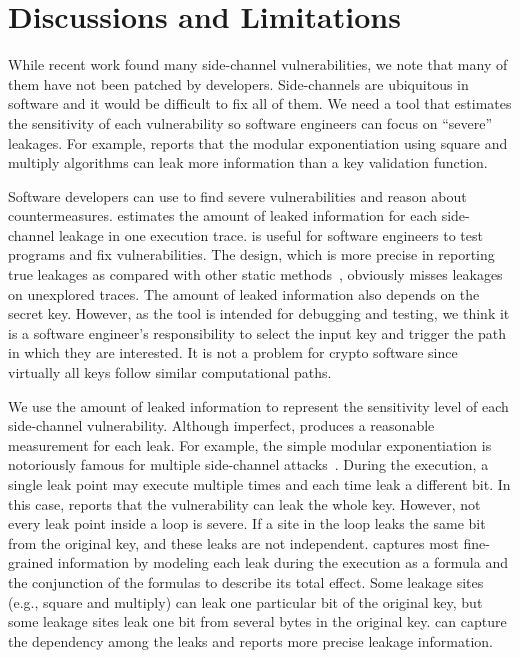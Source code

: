 \section{Discussions and Limitations}
While recent work found many side-channel vulnerabilities, 
we note that many of them have not been patched by developers.
Side-channels are ubiquitous in software and it would be difficult to fix all of them. 
We need a
tool that estimates the sensitivity of each vulnerability
so software engineers can focus on
``severe'' leakages. For example, \tool{} reports that 
the modular exponentiation using square and multiply algorithms can
leak more information than a key validation function.

Software developers can use \tool{} to find severe vulnerabilities
and reason about countermeasures.
\tool{} estimates the amount of leaked information for each side-channel leakage
in one execution trace. \tool{} is useful for software
engineers to test programs and fix vulnerabilities.
The design, which is more precise in reporting true leakages as compared with other static
methods~\cite{197207,BacelarAlmeida:2013:FVS:2483313.2483334}, obviously misses
leakages on unexplored traces. The amount of leaked information also depends on the secret key.
However, as the tool is intended for debugging and testing,
we think it is a software engineer's responsibility to select the input key and trigger 
the path in which they are interested. It is not a problem for crypto software 
since virtually all keys follow similar computational paths.

We use the amount of leaked information to represent the sensitivity level of 
each side-channel vulnerability. Although imperfect, \tool{} produces a reasonable 
measurement for each leak. For example, the simple modular exponentiation is 
notoriously famous for multiple side-channel attacks~\cite{kocher1996timing}. 
During the execution, a single leak point may execute multiple times
and each time leak a different bit. In this case, \tool{} reports that the 
vulnerability can leak the whole key. However, not every leak point inside a 
loop is severe. If a site in the loop leaks the same bit from the 
original key, and these leaks are not independent. \tool{} captures most 
fine-grained information by modeling each leak during the execution as a 
formula and the conjunction of the formulas to describe its total effect. 
Some leakage sites (e.g., square and multiply) 
can leak one particular bit of the original key, but some leakage sites leak one bit 
from several bytes in the original key. \tool{} can capture the dependency among the leaks and
reports more precise leakage information.

